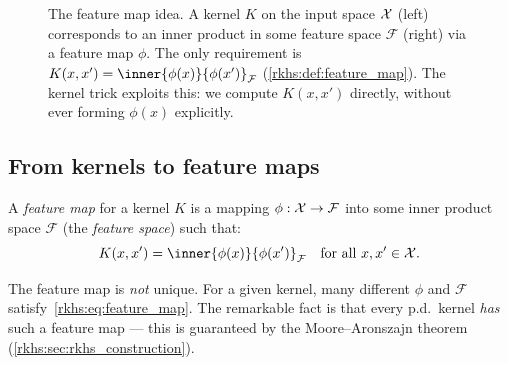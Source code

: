 \begin{notechapter}
\begin{figure}[ht]
\caption{The feature map idea. A kernel $K$ on the
input space $\mathcal{X}$ (left) corresponds to an inner product
in some feature space $\mathcal{F}$ (right) via a
feature map $\phi$. The only requirement is
$K(x,x') = \inner{\phi(x)}{\phi(x')}_{\mathcal{F}}$
(\cref{rkhs:def:feature_map}). The kernel trick
exploits this: we compute $K(x,x')$ directly, without
ever forming $\phi(x)$ explicitly.}
\label{rkhs:fig:feature_map_concept}
\end{figure}

\subsection{From kernels to feature maps}

\begin{definition}
\label{rkhs:def:feature_map}
A \emph{feature map} for a kernel $K$ is a mapping $\phi: \mathcal{X} \to
\mathcal{F}$ into some inner product space $\mathcal{F}$ (the
\emph{feature space}) such that:
\begin{equation}
\label{rkhs:eq:feature_map}
K(x, x') = \inner{\phi(x)}{\phi(x')}_{\mathcal{F}} \quad \text{for all } x, x' \in \X.
\end{equation}
\end{definition}

The feature map is \emph{not} unique. For a given kernel, many different
$\phi$ and $\mathcal{F}$ satisfy~\eqref{rkhs:eq:feature_map}. The remarkable
fact is that every p.d.\ kernel \emph{has} such a feature map --- this
is guaranteed by the Moore--Aronszajn theorem
(\cref{rkhs:sec:rkhs_construction}).


\end{notechapter}
